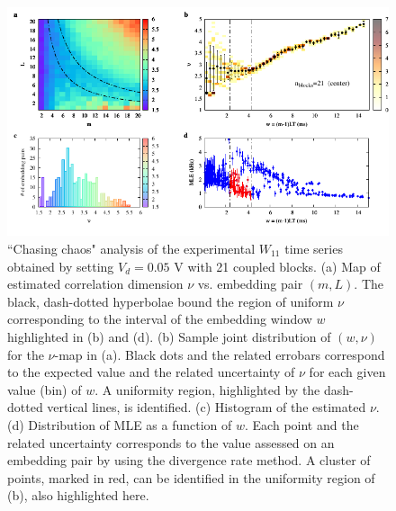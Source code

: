 \begin{figure}[H]
    \centering
    \includegraphics[width=\linewidth]{../blocks/21_blocks/middle/2e5_points/plots/chaos_low.pdf}
    \caption{``Chasing chaos" analysis of the experimental $W_{11}$ time series obtained by setting $V_d=0.05$ V with 21 coupled blocks.
    (a) Map of estimated correlation dimension $\nu$ vs. embedding pair $(m, L)$.
    The black, dash-dotted hyperbolae bound the region of uniform $\nu$ corresponding to the interval of the
    embedding window $w$ highlighted in (b) and (d).
    (b) Sample joint distribution of $(w,\nu)$ for the $\nu$-map in (a).
    Black dots and the related errobars correspond to the expected value and the related uncertainty of $\nu$
    for each given value (bin) of $w$. A uniformity region, highlighted by the dash-dotted vertical lines,
    is identified. (c) Histogram of the estimated $\nu$. (d) Distribution of MLE as a function of $w$. Each point and the related
    uncertainty corresponds to the value assessed on an embedding pair by using the divergence rate method.
    A cluster of points, marked in red, can be identified in the uniformity region of (b), also highlighted here.}
    \label{fig:21 blocks chaos middle}
\end{figure}



